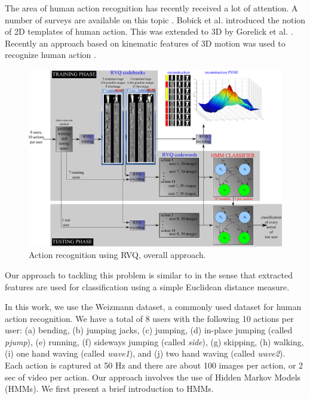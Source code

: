 \begin{Body}
The area of human action recognition has recently received a lot of attention.  A number of surveys are available on this topic \cite{1995_JNL_SURVEYmotion_Cedras, 1999_JNL_SURVEYmotion_Aggarwal, 1999_JNL_SURVEYmotion_Gavrila, 1999_REP_SURVEYmotion_Moeslund, 2001_JNL_SURVEYmotion_Moeslund, 2003_JNL_SURVEYiu_Buxton, 2003_JNL_SURVEYmotion_LWang, 2003_JNL_SURVEYbeh_Shah,2003_JNL_SURVEYaction_JWang, 2004_CNF_SURVEYaction_Aggarwal, 2004_JNL_SURVEYiu_Hu, 2004_CNF_SURVEYgait_Nixon, 2004_CNF_Survey3DshapeRetrieval, 2006_JNL_HumanMotion_Moeslund, 2007_JNL_HumanMotion_Poppe, 2008_CNF_SurveyHumanActivityRecognition_Ahad, 2010_JNL_SURVEYmotion_Ji}.  Bobick et al. \cite{2001_JNL_MotionTemplates_Bobick} introduced the notion of 2D templates of human action.  This was extended to 3D by Gorelick et al. \cite{2007_JNL_SpaceTimeShapes_Gorelick}.  Recently an approach based on kinematic features of 3D motion was used to recognize human action \cite{2010_JNL_ActionReconKinematic_Ali}.   

								\begin{figure}[t]
								\centering
								\includegraphics[width=1.0\textwidth]{figs/RVQ_HMM_IPCV2010_blockDiagram.pdf}
								\caption{Action recognition using RVQ, overall approach.}
								\label{fig:RVQ_HMM_IPCV2010_blockDiagram}
								\end{figure}


Our approach to tackling this problem is similar to \cite{2007_JNL_SpaceTimeShapes_Gorelick} in the sense that extracted features are used for classification using a simple Euclidean distance measure.  

In this work, we use the Weizmann dataset, a commonly used dataset for human action recognition.  We have a total of 8 users with the following 10 actions per user: (a) bending, (b) jumping jacks, (c) jumping, (d) in-place jumping (called \emph{pjump}), (e) running, (f) sideways jumping (called \emph{side}), (g) skipping, (h) walking, (i) one hand waving (called \emph{wave1}), and (j) two hand waving (called \emph{wave2}).  Each action is captured at 50 Hz and there are about 100 images per action, or 2 sec of video per action.  Our approach involves the use of Hidden Markov Models (HMMs).  We first present a brief introduction to HMMs.


\end{Body}
